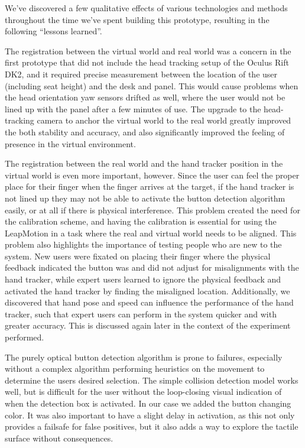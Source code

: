 We've discovered a few qualitative effects of various technologies and methods throughout the time we’ve spent building this prototype, resulting in the following ``lessons learned''.

The registration between the virtual world and real world was a concern in the first prototype that did not include the head tracking setup of the Oculus Rift DK2, and it required precise measurement between the location of the user (including seat height) and the desk and panel.
This would cause problems when the head orientation yaw sensors drifted as well, where the user would not be lined up with the panel after a few minutes of use.
The upgrade to the head-tracking camera to anchor the virtual world to the real world greatly improved the both stability and accuracy, and also significantly improved the feeling of presence in the virtual environment.

The registration between the real world and the hand tracker position in the virtual world is even more important, however.
Since the user can feel the proper place for their finger when the finger arrives at the target, if the hand tracker is not lined up they may not be able to activate the button detection algorithm easily, or at all if there is physical interference.
This problem created the need for the calibration scheme, and having the calibration is essential for using the LeapMotion in a task where the real and virtual world needs to be aligned.
This problem also highlights the importance of testing people who are new to the system.
New users were fixated on placing their finger where the physical feedback indicated the button was and did not adjust for misalignments with the hand tracker, while expert users learned to ignore the physical feedback and activated the hand tracker by finding the misaligned location.
Additionally, we discovered that hand pose and speed can influence the performance of the hand tracker, such that expert users can perform in the system quicker and with greater accuracy.
This is discussed again later in the context of the experiment performed.

The purely optical button detection algorithm is prone to failures, especially without a complex algorithm performing heuristics on the movement to determine the users desired selection.
The simple collision detection model works well, but is difficult for the user without the loop-closing visual indication of when the detection box is activated.
In our case we added the button changing color.
It was also important to have a slight delay in activation, as this not only provides a failsafe for false positives, but it also adds a way to explore the tactile surface without consequences.

